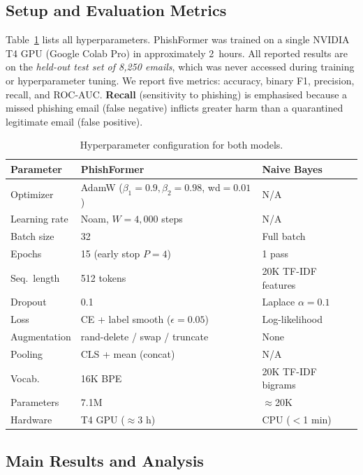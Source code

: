 \documentclass[sigconf, nonacm]{acmart}
\begin{document}
\subsection{Setup and Evaluation Metrics}

Table~\ref{tab:config} lists all hyperparameters.
PhishFormer was trained on a single NVIDIA T4 GPU (Google Colab Pro)
in approximately 2~hours.
All reported results are on the \emph{held-out test set of 8{,}250
emails}, which was never accessed during training or hyperparameter
tuning.
We report five metrics: accuracy, binary F1, precision, recall, and
ROC-AUC.
\textbf{Recall} (sensitivity to phishing) is emphasised because a
missed phishing email (false negative) inflicts greater harm than a
quarantined legitimate email (false positive).

\begin{table}[h]
\centering\small
\caption{Hyperparameter configuration for both models.}
\label{tab:config}
\begin{tabular}{@{}lll@{}}
\toprule
\textbf{Parameter} & \textbf{PhishFormer} & \textbf{Naive Bayes} \\
\midrule
Optimizer     & AdamW ($\beta_1{=}0.9,\beta_2{=}0.98$, wd$=0.01$) & N/A \\
Learning rate & Noam, $W{=}4{,}000$ steps & N/A \\
Batch size    & 32 & Full batch \\
Epochs        & 15 (early stop $P{=}4$) & 1 pass \\
Seq.\ length  & 512 tokens & 20K TF-IDF features \\
Dropout       & 0.1 & Laplace $\alpha{=}0.1$ \\
Loss          & CE + label smooth ($\epsilon{=}0.05$) & Log-likelihood \\
Augmentation  & rand-delete / swap / truncate & None \\
Pooling       & CLS + mean (concat) & N/A \\
Vocab.        & 16K BPE & 20K TF-IDF bigrams \\
Parameters    & 7.1M & $\approx$20K \\
Hardware      & T4 GPU ($\approx$3 h) & CPU ($<$1 min) \\
\bottomrule
\end{tabular}
\end{table}

\subsection{Main Results and Analysis}
\end{document}
